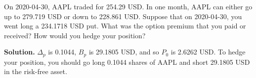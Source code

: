 \noindent On 2020-04-30, AAPL traded for 254.29 USD. In one month, AAPL can either go up to 279.719 USD or down to 228.861 USD. Suppose that on 2020-04-30, you went long a 234.1718 USD put. What was the option premium that you paid or received? How would you hedge your position?

\vspace{9pt}

\noindent\textbf{Solution.} $\Delta_{p}$ is 0.1044, $B_{p}$ is 29.1805 USD, and so $P_{0}$ is 2.6262 USD. To hedge your position, you should go long 0.1044 shares of AAPL and short 29.1805 USD in the risk-free asset.
